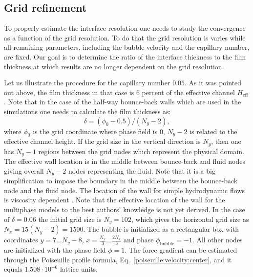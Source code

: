 \documentclass[preprint,12pt]{elsarticle}
\begin{document}
\subsection{Grid refinement}
To properly estimate the interface resolution one needs to study the convergence as a function of
the grid resolution. To do that the grid resolution is varies while all remaining parameters,
including the bubble velocity and the capillary number, are fixed.  Our goal is to determine the 
ratio of the interface thickness to the 
film thickness at which results are no longer dependent on the grid resolution.

Let us illustrate the procedure for the capillary number
$0.05$. As it was pointed out above, the film thickness in that case is $6$ percent of the
effective
channel $H_{\mathrm{eff}}$.
Note that in the case of the half-way bounce-back walls \cite{yu} which are used in the
simulations one needs to calculate the film thickness as:
\begin{equation}
\delta=(\phi_0-0.5)/(N_y-2),
\end{equation}
where $\phi_0$ is the grid coordinate where phase field is $0$, $N_y-2$
is related to the effective channel height.
If the grid size in the vertical direction is $N_y$, then one has $N_y-1$ regions between the grid nodes which represent
the physical domain. The effective wall location is in the middle between bounce-back and fluid nodes giving
overall $N_y-2$ nodes representing the fluid. Note that it is a big
simplification to impose the boundary in the middle between the bounce-back
node and the fluid node. The location of the wall for simple hydrodynamic flows is
viscosity dependent \cite{ginzburg-multireflection}.  Note that the effective location of the
wall for the
multiphase models to the best authors' knowledge is not yet derived. In the case of $\delta=0.06$
the
initial grid size is $N_y=102$, which gives the horizontal grid size as $N_x=15(N_y-2)=1500$.
The bubble is initialized as a rectangular box with coordinates
$y=7\dots N_y-8$, $x=\frac{N_x}{3}\dots \frac{2 N_x}{3}$ and phase
$\phi_{\mathrm{bubble}}=-1$. All other nodes are initialized with the phase field
$\phi=1$. The force gradient can be estimated through the Poiseuille
profile formula, Eq.~\ref{poiseuille:velocity:center}, and it equals
$1.508 \cdot 10^{-6}$ lattice units.
\end{document}
